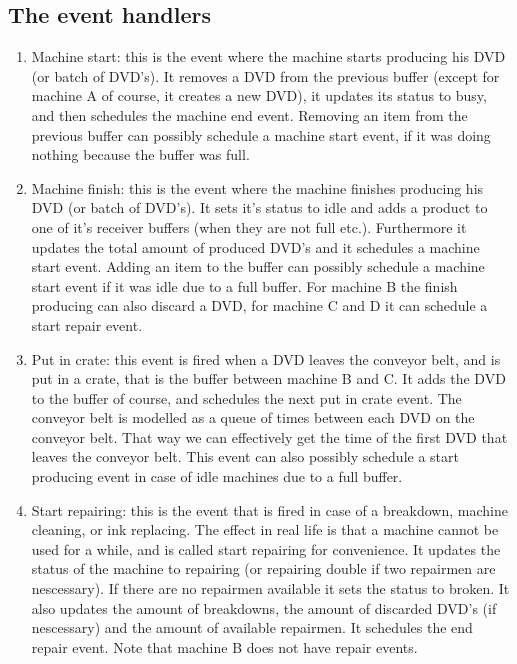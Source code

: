 \documentclass{article}
\begin{document}
\subsection{The event handlers}
\begin{enumerate}
    \item Machine start:
        this is the event where the machine starts producing his DVD (or batch of DVD's).
        It removes a DVD from the previous buffer
        (except for machine A of course, it creates a new DVD),
        it updates its status to busy, and then schedules the machine end event.
        Removing an item from the previous buffer can possibly schedule a machine start event, if it was doing nothing because the buffer was full.
    \item Machine finish:
        this is the event where the machine finishes producing his DVD (or batch of DVD's).
        It sets it's status to idle and adds a product to one of it's receiver buffers (when they are not full etc.).
        Furthermore it updates the total amount of produced DVD's and it schedules a machine start event.
        Adding an item to the buffer can possibly schedule a machine start event if it was idle due to a full buffer.
        For machine B the finish producing can also discard a DVD,
        for machine C and D it can schedule a start repair event.

    \item Put in crate:
        this event is fired when a DVD leaves the conveyor belt, and is put in a crate, that is the buffer between machine B and C.
        It adds the DVD to the buffer of course, and schedules the next put in crate event.
        The conveyor belt is modelled as a queue of times between each DVD on the conveyor belt. That way we can effectively get the time of the first DVD that leaves the conveyor belt.
        This event can also possibly schedule a start producing event in case of idle machines due to a full buffer.

    \item Start repairing:
        this is the event that is fired in case of a breakdown, machine cleaning, or ink replacing. The effect in real life is that a machine cannot be used for a while, and is called start repairing for convenience.
        It updates the status of the machine to repairing
        (or repairing double if two repairmen are nescessary).
        If there are no repairmen available it sets the status to broken.
        It also updates the amount of breakdowns, the amount of discarded DVD's (if nescessary) and the amount of available repairmen.
        It schedules the end repair event.
        Note that machine B does not have repair events.


\end{enumerate}
\end{document}
